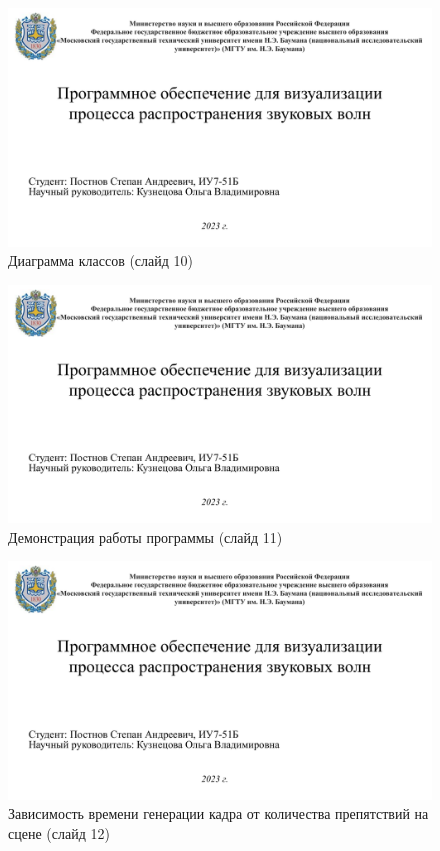 \begin{figure}[h]
\centering
\includegraphics[height=0.5\textheight, page=10, angle=90]{inc/img/pres.pdf}
\caption{Диаграмма классов (слайд 10)}
\end{figure}
\begin{figure}[h]
\centering
\includegraphics[height=0.5\textheight, page=11, angle=90]{inc/img/pres.pdf}
\caption{Демонстрация работы программы (слайд 11)}
\end{figure}
\begin{figure}[h]
\centering
\includegraphics[height=0.5\textheight, page=12, angle=90]{inc/img/pres.pdf}
\caption{Зависимость времени генерации кадра от количества препятствий на сцене (слайд 12)}
\end{figure}
